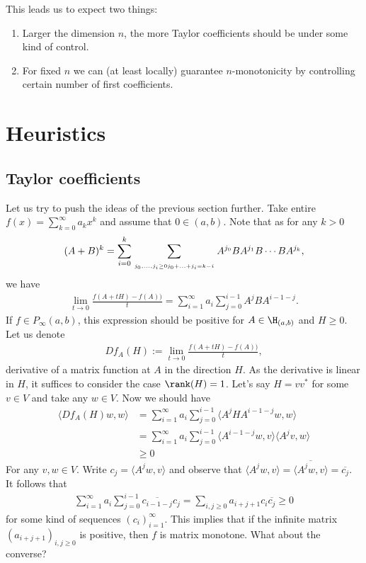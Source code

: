 This leads us to expect two things:

\begin{enumerate}
	\item Larger the dimension $n$, the more Taylor coefficients should be under some kind of control.
	\item For fixed $n$ we can (at least locally) guarantee $n$-monotonicity by controlling certain number of first coefficients.
\end{enumerate}

\section{Heuristics}

\subsection{Taylor coefficients}

Let us try to push the ideas of the previous section further. Take entire $f(x) = \sum_{k = 0}^{\infty} a_{k} x^{k}$ and assume that $0 \in (a, b)$. Note that as for any $k > 0$
\begin{align*}
	(A + B)^k = \sum_{i = 0}^{k} \sum_{\atop{j_{0}, \ldots, j_{i} \geq 0}{j_{0} + \ldots + j_{i} = k - i}} A^{j_{0}} B A^{j_{1}} B \cdots B A^{j_{k}},
\end{align*}
we have
\begin{align*}
	\lim_{t \to 0} \frac{f(A + t H) - f(A))}{t} = \sum_{i = 1}^{\infty} a_{i} \sum_{j = 0}^{i - 1} A^{j} B A^{i - 1 - j}.
\end{align*}
If $f \in P_{\infty}(a, b)$, this expression should be positive for $A \in \H_{(a, b)}$ and $H \geq 0$. Let us denote
\begin{align*}
	D f_{A}(H) := \lim_{t \to 0} \frac{f(A + t H) - f(A))}{t},
\end{align*}
derivative of a matrix function at $A$ in the direction $H$. As the derivative is linear in $H$, it suffices to consider the case $\rank(H) = 1$. Let's say $H = v v^{*}$ for some $v \in V$ and take any $w \in V$. Now we should have
\begin{align*}
	\langle D f_{A}(H) w, w \rangle &= \sum_{i = 1}^{\infty} a_{i} \sum_{j = 0}^{i - 1} \langle A^{j} H A^{i - 1 - j} w, w \rangle \\
	&= \sum_{i = 1}^{\infty} a_{i} \sum_{j = 0}^{i - 1} \langle  A^{i - 1 - j} w, v \rangle \langle A^{j} v, w \rangle \\
	&\geq 0
\end{align*}
For any $v, w \in V$. Write $c_{j} = \langle A^{j} w, v \rangle$ and observe that $\langle  A^{j} w, v \rangle = \overline{\langle A^{j} w, v \rangle} = \overline{c_{j}}$. It follows that
\begin{align*}
	\sum_{i = 1}^{\infty} a_{i} \sum_{j = 0}^{i - 1} \overline{c_{i - 1 - j}} c_{j} = \sum_{i, j \geq 0} a_{i + j + 1} c_{i} \overline{c_{j}} \geq 0
\end{align*}
for some kind of sequences $(c_{i})_{i = 1}^{\infty}$. This implies that if the infinite matrix $(a_{i + j + 1})_{i, j \geq 0}$ is positive, then $f$ is matrix monotone. What about the converse?

